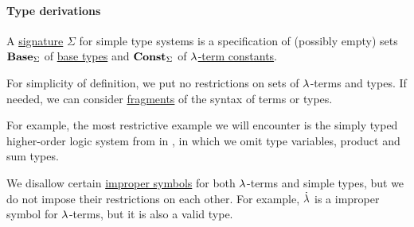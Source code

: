 \paragraph{Type derivations}

\begin{definition}\label{def:simple_type_signature}\mimprovised
  A \hyperref[con:logical_system_signature]{signature} \( \Sigma \) for simple type systems is a specification of (possibly empty) sets \( \op*{Base}_\Sigma \) of \hyperref[def:simple_type]{base types} and \( \op*{Const}_\Sigma \) of \hyperref[def:lambda_term]{\( {\mathrm \lambda} \)-term constants}.
\end{definition}
\begin{comments}
  \item For simplicity of definition, we put no restrictions on sets of \( {\mathrm \lambda} \)-terms and types. If needed, we can consider \hyperref[con:syntax_fragment]{fragments} of the syntax of terms or types.

  For example, the most restrictive example we will encounter is the simply typed higher-order logic system from in , in which we omit type variables, product and sum types.

  \item We disallow certain \hyperref[con:improper_symbol]{improper symbols} for both \( {\mathrm \lambda} \)-terms and simple types, but we do not impose their restrictions on each other. For example, \( \mathord{\dot{{\mathrm \lambda}}} \) is a improper symbol for \( {\mathrm \lambda} \)-terms, but it is also a valid type.
\end{comments}

